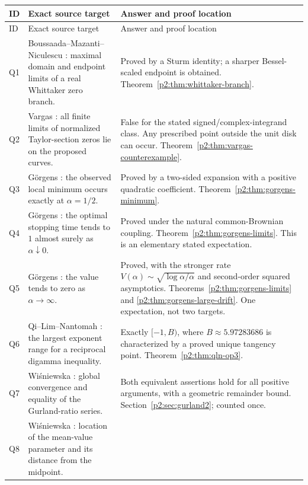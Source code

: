 \documentclass[11pt,a4paper]{article}
\theoremstyle{definition}
\theoremstyle{remark}
\numberwithin{equation}{section}
\begin{document}
\small
\begin{longtable}{@{}p{}p{}p{}@{}}
\toprule ID & Exact source target & Answer and proof location \\\midrule
\endfirsthead
\toprule ID & Exact source target & Answer and proof location \\\midrule
\endhead
Q1 & Boussaada--Mazanti--Niculescu \cite[p.~6, after Fig.~1]{p2:BMN2022}:
maximal domain and endpoint limits of a real Whittaker zero branch.
& Proved by a Sturm identity; a sharper Bessel-scaled endpoint is obtained.
Theorem~\ref{p2:thm:whittaker-branch}. \\
Q2 & Vargas \cite[Conjecture~5.1]{p2:Vargas2014}: all finite limits of
normalized Taylor-section zeros lie on the proposed curves.
& False for the stated signed/complex-integrand class. Any prescribed
point outside the unit disk can occur. Theorem~\ref{p2:thm:vargas-counterexample}. \\
Q3 & G\"orgens \cite[Section~4]{p2:Gorgens2014}: the observed local minimum
occurs exactly at $\alpha=1/2$.
& Proved by a two-sided expansion with a positive quadratic coefficient.
Theorem~\ref{p2:thm:gorgens-minimum}. \\
Q4 & G\"orgens \cite[Section~4]{p2:Gorgens2014}: the optimal stopping time
tends to $1$ almost surely as $\alpha\downarrow0$.
& Proved under the natural common-Brownian coupling.
Theorem~\ref{p2:thm:gorgens-limits}. This is an elementary stated expectation. \\
Q5 & G\"orgens \cite[Introduction]{p2:Gorgens2014}: the value tends to zero
as $\alpha\to\infty$.
& Proved, with the stronger rate
$V(\alpha)\sim\sqrt{\log\alpha/\alpha}$ and second-order squared asymptotics.
Theorems~\ref{p2:thm:gorgens-limits} and \ref{p2:thm:gorgens-large-drift}.
One expectation, not two targets. \\
Q6 & Qi--Lim--Nantomah \cite[Open Problem~3]{p2:qln2025}: the largest
exponent range for a reciprocal digamma inequality.
& Exactly $[-1,B)$, where $B\approx5.97283686$ is characterized by a
proved unique tangency point. Theorem~\ref{p2:thm:qln-op3}. \\
Q7 & Wi\'sniewska \cite[Open Problems~1 and~2]{p2:Wis2025}: global convergence
and equality of the Gurland-ratio series.
& Both equivalent assertions hold for all positive arguments, with a
geometric remainder bound. Section~\ref{p2:sec:gurland2}; counted once. \\
Q8 & Wi\'sniewska \cite[Open Problem~3]{p2:Wis2025}: location of the
mean-value parameter and its distance from the midpoint.

\end{longtable}
\end{document}

